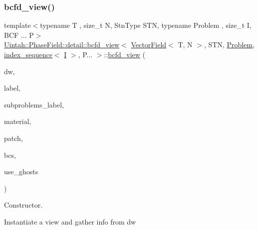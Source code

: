 \subsubsection{\texorpdfstring{bcfd\+\_\+view()}{bcfd\_view()}\hspace{0.1cm}{\footnotesize\ttfamily [2/3]}}
{\footnotesize\ttfamily template$<$typename T , size\+\_\+t N, Stn\+Type S\+TN, typename Problem , size\+\_\+t I, B\+C\+F ... P$>$ \\
\hyperlink{classUintah_1_1PhaseField_1_1detail_1_1bcfd__view}{Uintah\+::\+Phase\+Field\+::detail\+::bcfd\+\_\+view}$<$ \hyperlink{structUintah_1_1PhaseField_1_1VectorField}{Vector\+Field}$<$ T, N $>$, S\+TN, \hyperlink{classUintah_1_1PhaseField_1_1Problem}{Problem}, \hyperlink{namespaceUintah_1_1PhaseField_a237de804d99512e50613aff7c94a9461}{index\+\_\+sequence}$<$ \hyperlink{structUintah_1_1PhaseField_1_1I}{I} $>$, P... $>$\+::\hyperlink{classUintah_1_1PhaseField_1_1detail_1_1bcfd__view}{bcfd\+\_\+view} (\begin{DoxyParamCaption}\item[{Data\+Warehouse $\ast$}]{dw,  }\item[{const typename \hyperlink{structUintah_1_1PhaseField_1_1VectorField_a59698346336d8cdfdf767367839f2be9}{Field\+::label\+\_\+type} \&}]{label,  }\item[{const Var\+Label $\ast$}]{subproblems\+\_\+label,  }\item[{int}]{material,  }\item[{const Patch $\ast$}]{patch,  }\item[{const std\+::vector$<$ \hyperlink{structUintah_1_1PhaseField_1_1BCInfo}{B\+C\+Info}$<$ \hyperlink{structUintah_1_1PhaseField_1_1VectorField}{Field} $>$ $>$ \&}]{bcs,  }\item[{bool}]{use\+\_\+ghosts }\end{DoxyParamCaption})\hspace{0.3cm}{\ttfamily [inline]}}



Constructor. 

Instantiate a view and gather info from dw


